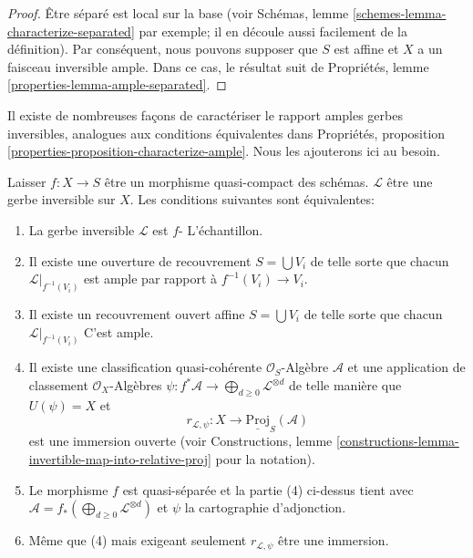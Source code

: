 \begin{proof}
Être séparé est local sur la base (voir Schémas, lemme \ref{schemes-lemma-characterize-separated} par exemple; il en découle aussi facilement de la définition). Par conséquent, nous pouvons supposer que $S$ est affine et $X$ a un faisceau inversible ample. Dans ce cas, le résultat suit de Propriétés, lemme \ref{properties-lemma-ample-separated}.
\end{proof}

\noindent
Il existe de nombreuses façons de caractériser le rapport amples gerbes inversibles, analogues aux conditions équivalentes dans Propriétés, proposition \ref{properties-proposition-characterize-ample}. Nous les ajouterons ici au besoin.

\begin{lemma}

\label{lemma-characterize-relatively-ample}

\begin{reference}\cite[II, Proposition 4.6.3]{EGA}\end{reference}

Laisser $f : X \to S$ être un morphisme quasi-compact des schémas. $\mathcal{L}$ être une gerbe inversible sur $X$. Les conditions suivantes sont équivalentes:

\begin{enumerate}

\item La gerbe inversible $\mathcal{L}$ est $f$- L'échantillon.
\item Il existe une ouverture de recouvrement $S = \bigcup V_i$
de telle sorte que chacun $\mathcal{L}|_{f^{-1}(V_i)}$ est ample par rapport à $f^{-1}(V_i) \to V_i$.
\item Il existe un recouvrement ouvert affine $S = \bigcup V_i$
de telle sorte que chacun $\mathcal{L}|_{f^{-1}(V_i)}$ C'est ample.
\item Il existe une classification quasi-cohérente $\mathcal{O}_S$-Algèbre
$\mathcal{A}$ et une application de classement $\mathcal{O}_X$-Algèbres
$\psi : f^*\mathcal{A} \to \bigoplus_{d \geq 0} \mathcal{L}^{\otimes d}$
de telle manière que $U(\psi) = X$ et
$$
r_{\mathcal{L}, \psi} :
X
\longrightarrow
\underline{\text{Proj}}_S(\mathcal{A})
$$
est une immersion ouverte (voir Constructions, lemme
\ref{constructions-lemma-invertible-map-into-relative-proj} pour la notation).
\item Le morphisme $f$ est quasi-séparée et la partie (4) ci-dessus tient avec
$\mathcal{A} = f_*(\bigoplus_{d \geq 0} \mathcal{L}^{\otimes d})$
et $\psi$ la cartographie d'adjonction.
\item Même que (4) mais exigeant seulement $r_{\mathcal{L}, \psi}$
être une immersion.

\end{enumerate}

\end{lemma}

